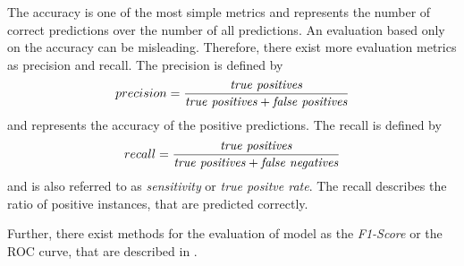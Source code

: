 The accuracy is one of the most simple metrics and represents the number of correct predictions over the number of all predictions.
An evaluation based only on the accuracy can be misleading.
Therefore, there exist more evaluation metrics as precision and recall.
The precision is defined by
\begin{equation}
	precision = \frac{\textnormal{\textit{true positives}}}{\textnormal{\textit{true positives}} + \textnormal{\textit{false positives}}}
\end{equation}
and represents the accuracy of the positive predictions.
The recall is defined by
\begin{equation}
	recall = \frac{\textnormal{\textit{true positives}}}{\textnormal{\textit{true positives}} + \textnormal{\textit{false negatives}}}
\end{equation}
and is also referred to as \textit{sensitivity} or \textit{true positve rate}.
The recall describes the ratio of positive instances, that are predicted correctly.

Further, there exist methods for the evaluation of model as the \textit{F1-Score} or the ROC curve, that are described in \cite{Ger17-HandsOn}.